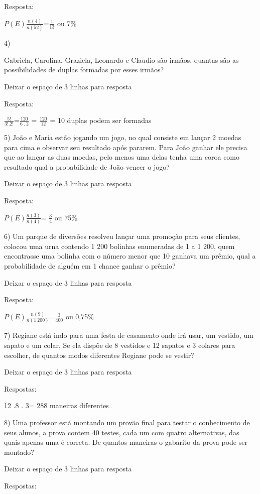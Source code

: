 Resposta:

\(P(E)\frac{n(4)}{n(52)}\)=\(\frac{1}{13}\) ou 7\%

4)

Gabriela, Carolina, Graziela, Leonardo e Claudio são irmãos, quantas são
as possibilidades de duplas formadas por esses irmãos?

Deixar o espaço de 3 linhas para resposta

Resposta:

\(\frac{5!}{3!.2!}\)=\(\frac{120}{6\ .\ 2}\) = \(\frac{120}{12}\) = 10
duplas podem ser formadas

5) João e Maria estão jogando um jogo, no qual consiste em lançar 2
moedas para cima e observar seu resultado após pararem. Para João ganhar
ele precisa que ao lançar as duas moedas, pelo menos uma delas tenha uma
coroa como resultado qual a probabilidade de João vencer o jogo?

Deixar o espaço de 3 linhas para resposta

Resposta:

\(P(E)\frac{n(3)}{n(4)}\)= \(\frac{3}{4}\) ou 75\%

6) Um parque de diversões resolveu lançar uma promoção para seus
clientes, colocou uma urna contendo 1 200 bolinhas enumeradas de 1 a 1
200, quem encontrasse uma bolinha com o número menor que 10 ganhava um
prêmio, qual a probabilidade de alguém em 1 chance ganhar o prêmio?

Deixar o espaço de 3 linhas para resposta

Resposta:

\(P(E)\frac{n(9)}{n(1\ 200)}\)=\(\frac{3}{400}\) ou 0,75\%

7) Regiane está indo para uma festa de casamento onde irá usar, um
vestido, um sapato e um colar, Se ela dispõe de 8 vestidos e 12 sapatos
e 3 colares para escolher, de quantos modos diferentes Regiane pode se
vestir?

Deixar o espaço de 3 linhas para resposta

Respostas:

12 .8 . 3= 288 maneiras diferentes

8) Uma professor está montando um provão final para testar o
conhecimento de seus alunos, a prova contem 40 testes, cada um com
quatro alternativas, das quais apenas uma é correta. De quantos maneiras
o gabarito da prova pode ser montado?

Deixar o espaço de 3 linhas para resposta

Respostas:

